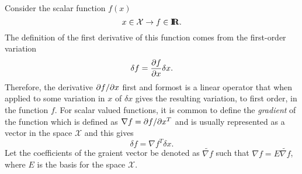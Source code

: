 Consider the scalar function $f(x)$
\[
x\in\mathcal{X} \rightarrow f\in\mbox{\textbf{I}}\hspace{-0.6ex}\mbox{\textbf{R}}.
\]
The definition of the first derivative of this function comes from the
first-order variation
\[
\delta f = \displaystyle{\frac{\partial f}{\partial x}} \delta x.
\]
Therefore, the derivative $\partial f / \partial x$ first and formost is a linear operator
that when applied to some variation in $x$ of $\delta x$ gives the resulting
variation, to first order, in the function $f$.  For scalar valued functions,
it is common to define the {}\textit{gradient} of the function which is
defined as $\nabla f = \partial f / \partial x^T$ and is usually represented as a vector in
the space $\mathcal{X}$ and this gives
\[
\delta f = {\nabla f}^T \delta x.
\]
Let the coefficients of the graient vector be denoted as $\tilde{\nabla f}$
such that $\nabla f = E {}\tilde{\nabla f}$, where $E$ is the basis for the
space $\mathcal{X}$.

